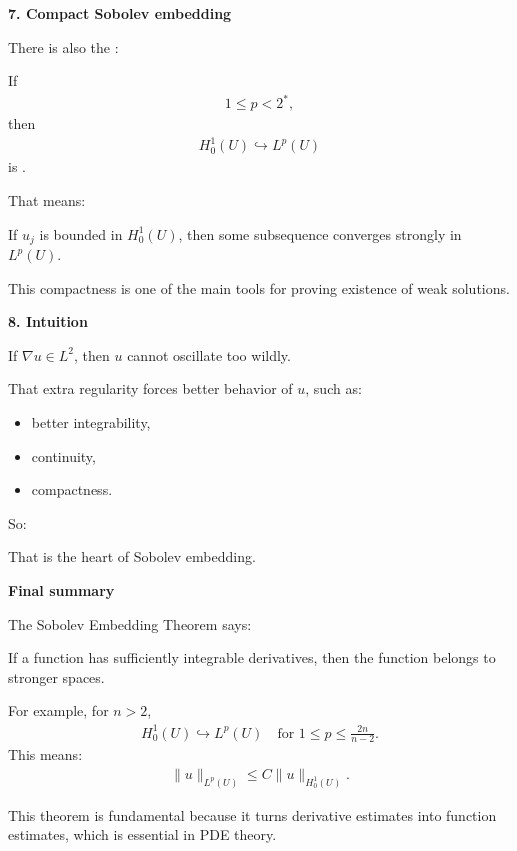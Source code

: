 \documentclass[12pt,a4paper]{report}
\begin{document}
\begin{description}
\begin{description}
\item \textbf{7. Compact Sobolev embedding}

There is also the :

If
\begin{align*}
1\le p<2^*,
\end{align*}
then
\begin{align*}
H_0^1(U)\hookrightarrow L^p(U)
\end{align*}
is .

That means:

If $u_j$ is bounded in $H_0^1(U)$, then some subsequence converges strongly in $L^p(U)$.

This compactness is one of the main tools for proving existence of weak solutions.

\item \textbf{8. Intuition}

If $\nabla u\in L^2$, then $u$ cannot oscillate too wildly.

That extra regularity forces better behavior of $u$, such as:
\begin{itemize}
\item better integrability,
\item continuity,
\item compactness.
\end{itemize}
So:

\> 

That is the heart of Sobolev embedding.

\item \textbf{Final summary}

The Sobolev Embedding Theorem says:

\> If a function has sufficiently integrable derivatives, then the function belongs to stronger spaces.

For example, for $n>2$,
\begin{align*}
H_0^1(U)\hookrightarrow L^p(U) \quad\text{for }1\le p\le \frac{2n}{n-2}.
\end{align*}
This means:
\begin{align*}
\|u\|_{L^p(U)} \le C\|u\|_{H_0^1(U)}.
\end{align*}

This theorem is fundamental because it turns derivative estimates into function estimates, which is essential in PDE theory.
\end{description}


\end{description}
\end{document}
